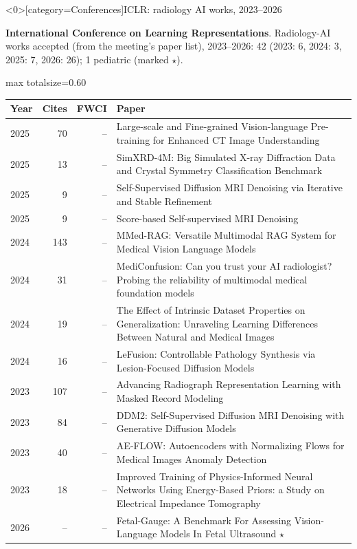 \documentclass[aspectratio=169]{beamer}
\renewcommand{\arraystretch}{1.08}
\begin{document}
\begin{frame}<0>[category=Conferences]{ICLR: radiology AI works, 2023--2026}
{\scriptsize \textbf{International Conference on Learning Representations}. Radiology-AI works accepted (from the meeting's paper list), 2023--2026: 42 (2023: 6, 2024: 3, 2025: 7, 2026: 26); 1 pediatric (marked $\star$).\par}\vspace{2pt}
\tiny
\begin{adjustbox}{max totalsize={\textwidth}{0.60\textheight}}
\renewcommand{\arraystretch}{1.2}
\begin{tabular}{|l|r|r|>{\raggedright\arraybackslash}p{}|}
\hline \textbf{Year} & \textbf{Cites} & \textbf{FWCI} & \textbf{Paper} \\ \hline
2025 & 70 & -- & Large-scale and Fine-grained Vision-language Pre-training for Enhanced CT Image Understanding \\ \hline
2025 & 13 & -- & SimXRD-4M: Big Simulated X-ray Diffraction Data and Crystal Symmetry Classification Benchmark \\ \hline
2025 & 9 & -- & Self-Supervised Diffusion MRI Denoising via Iterative and Stable Refinement \\ \hline
2025 & 9 & -- & Score-based Self-supervised MRI Denoising \\ \hline
2024 & 143 & -- & MMed-RAG: Versatile Multimodal RAG System for Medical Vision Language Models \\ \hline
2024 & 31 & -- & MediConfusion: Can you trust your AI radiologist? Probing the reliability of multimodal medical foundation models \\ \hline
2024 & 19 & -- & The Effect of Intrinsic Dataset Properties on Generalization: Unraveling Learning Differences Between Natural and Medical Images \\ \hline
2024 & 16 & -- & LeFusion: Controllable Pathology Synthesis via Lesion-Focused Diffusion Models \\ \hline
2023 & 107 & -- & Advancing Radiograph Representation Learning with Masked Record Modeling \\ \hline
2023 & 84 & -- & DDM2: Self-Supervised Diffusion MRI Denoising with Generative Diffusion Models \\ \hline
2023 & 40 & -- & AE-FLOW: Autoencoders with Normalizing Flows for Medical Images Anomaly Detection \\ \hline
2023 & 18 & -- & Improved Training of Physics-Informed Neural Networks Using Energy-Based Priors: a Study on Electrical Impedance Tomography \\ \hline
2026 & -- & -- & Fetal-Gauge: A Benchmark For Assessing Vision-Language Models In Fetal Ultrasound $\star$ \\ \hline
\end{tabular}
\end{adjustbox}
\\[2pt]
\end{frame}
\end{document}
